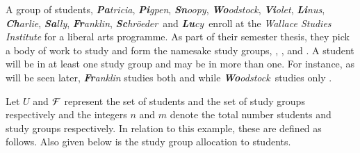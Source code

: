 \documentclass[MS,]{iitmdiss}
\begin{document}
\def \xLLL {\mathbb{B}}
\def \xGGG {\mathbb{T}} 
\def \xBBB {\mathbb{W}}
\def \xTTT {\mathbb{F}}




\def \Pa {{\em {\bf Pa}tricia}} 
\def \Pi {{\em {\bf Pi}gpen}} %
\def \Sn {{\em {\bf Sn}oopy}}
\def \Wo {{\em {\bf Wo}odstock}}
\def \Vi {{\em {\bf Vi}olet}} 
\def \Li {{\em {\bf Li}nus}} 
\def \Ch {{\em {\bf Ch}arlie}}
\def \Sa {{\em {\bf Sa}lly}}
\def \Fr {{\em {\bf Fr}anklin}}  %
\def \Sc {{\em {\bf Sc}hr{\"o}eder}} 
\def \Lu {{\em {\bf Lu}cy}}

\def \xPa {{\bf Pa}} 
\def \xPi {{\bf Pi}} 
\def \xSn {{\bf Sn}}
\def \xWo {{\bf Wo}}
\def \xVi {{\bf Vi}} 
\def \xLi {{\bf Li}} 
\def \xCh {{\bf Ch}}
\def \xSa {{\bf Sa}}
\def \xFr {{\bf Fr}}
\def \xSc {{\bf Sc}} 
\def \xLu {{\bf Lu}}

\def \residenceblock {{\em Infinite Loop}}

\def \WSI {{\em Wallace Studies Institute}}

\def \coneohone {{\em ``Influence of post modernism in Wallace's work''}}
\def \coneohtwo {{\em ``A study on fragmented prose method''}}


A group of students, \Pa, \Pi, \Sn, \Wo, \Vi, \Li, \Ch, \Sa, \Fr,
  \Sc\ and \Lu\ enroll at the
{\WSI} for a liberal arts programme.  As part
of their semester thesis, they pick a body of work to study and form
the namesake study groups, {\LLL}, {\GGG}, {\BBB} and {\TTT}. A student
will be in at least one study group and may be in more than one. For
instance, as will be seen later, {\Fr} studies both {\LLL} and {\TTT}
while \Wo\ studies only \BBB.

Let $U$ and ${\cal F}$ represent the set of students and the set of study
groups respectively and the integers $n$ and $m$ denote the total
number students and study groups respectively. In relation to this
example, these are defined as follows. Also given below is the study group
allocation to students. 
\end{document}
